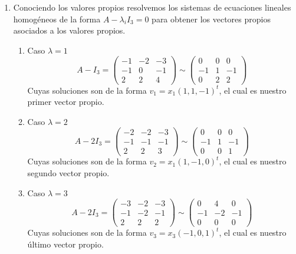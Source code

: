 \documentclass[letter]{memoir} %
\begin{document}
\begin{enumerate}
\begin{enumerate}
\item 
Conociendo los valores propios resolvemos los sistemas de ecuaciones lineales homogéneos de la forma $A-\lambda_i I_3 = 0$ para obtener los vectores propios asociados a los valores propios. 
\begin{enumerate}
\item Caso $\lambda = 1$\\
\[A - I_3 = \begin{pmatrix}
			-1 & -2 & -3 \\
            -1 &0  &-1 \\
             2 &2 & 4
            \end{pmatrix} \sim
            \begin{pmatrix}
			0 & 0 & 0 \\
            -1 &1  &-1 \\
             0 &2 & 2
            \end{pmatrix}
\]
Cuyas soluciones son de la forma $v_1 = x_1(1, 1, -1)^t$, el cual es nuestro primer vector propio.
\item Caso $\lambda = 2$\\
\[A - 2I_3 = \begin{pmatrix}
			-2 & -2 & -3 \\
            -1 &-1  &-1 \\
             2 &2 & 3
            \end{pmatrix} \sim
            \begin{pmatrix}
			0 & 0 & 0 \\
            -1 &1  &-1 \\
             0 &0 & 1
            \end{pmatrix}
\]
Cuyas soluciones son de la forma $v_2 = x_1(1, -1, 0)^t$, el cual es nuestro segundo vector propio.
\item Caso $\lambda = 3$\\
\[A - 2I_3 = \begin{pmatrix}
			-3 & -2 & -3 \\
            -1 &-2  &-1 \\
             2 &2 & 2
            \end{pmatrix} \sim
            \begin{pmatrix}
			0 & 4 & 0 \\
            -1 &-2  &-1 \\
             0 &0 & 0
            \end{pmatrix}
\]
Cuyas soluciones son de la forma $v_3 = x_3(-1, 0, 1)^t$, el cual es nuestro último vector propio.


\end{enumerate}
\end{enumerate}
\end{enumerate}
\end{document}
